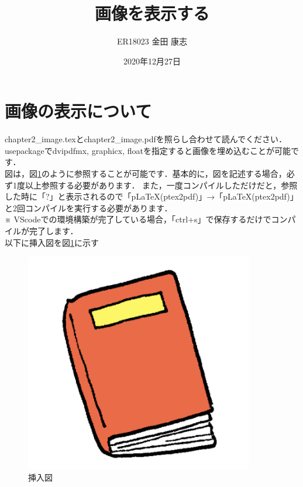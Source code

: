 \documentclass[a4paper,10pt]{jsarticle}
\title{画像を表示する}%
\author{ER18023 金田 康志}%
\date{2020年12月27日}%
\begin{document}
\maketitle%
\section{画像の表示について}
chapter2\_image.texとchapter2\_image.pdfを照らし合わせて読んでください．\\

usepackageでdvipdfmx, graphicx, floatを指定すると画像を埋め込むことが可能です．\\

図は，図\ref{fig:label}のように参照することが可能です．基本的に，図を記述する場合，必ず1度以上参照する必要があります．
また，一度コンパイルしただけだと，参照した時に「?」と表示されるので「pLaTeX(ptex2pdf)」→「pLaTeX(ptex2pdf)」と2回コンパイルを実行する必要があります．\\
※ VScodeでの環境構築が完了している場合，「ctrl+s」で保存するだけでコンパイルが完了します．\\

以下に挿入図を図\ref{fig:label}に示す
\begin{figure}[h]
    \begin{center}
        \includegraphics[width=100mm]{sample1.png}
    \end{center}
    \caption{挿入図}
    \label{fig:label}
\end{figure}
\end{document}
